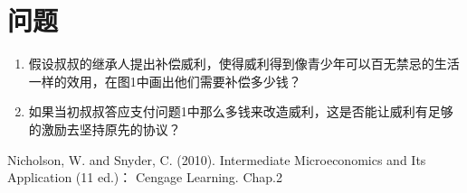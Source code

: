 \documentclass[10pt, a4paper]{ctexart} %
\begin{document}
\section*{问题}
\begin{enumerate}
	\item 假设叔叔的继承人提出补偿威利，使得威利得到像青少年可以百无禁忌的生活一样的效用，在图1中画出他们需要补偿多少钱？
	\item 如果当初叔叔答应支付问题1中那么多钱来改造威利，这是否能让威利有足够的激励去坚持原先的协议？	
	
\end{enumerate}




\small
\begin{thebibliography}{99}
	\setlength{\parskip}{0pt} %
	 Nicholson, W. and Snyder, C. (2010). Intermediate Microeconomics and Its Application (11 ed.)： Cengage Learning. Chap.2
	\end {thebibliography}
\end{document}
